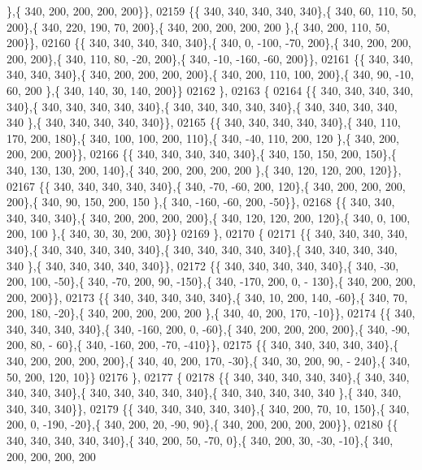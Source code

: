 \begin{DoxyCode}
      \},\{ 340, 200, 200, 200, 200\}\},
02159 \{\{ 340, 340, 340, 340, 340\},\{ 340,  60, 110,  50, 200\},\{ 340, 220, 190,  70, 200\},\{ 340, 200, 200, 200, 200
      \},\{ 340, 200, 110,  50, 200\}\},
02160 \{\{ 340, 340, 340, 340, 340\},\{ 340,   0, -100, -70, 200\},\{ 340, 200, 200, 200, 200\},\{ 340, 110,  80, -20, 
      200\},\{ 340, -10, -160, -60, 200\}\},
02161 \{\{ 340, 340, 340, 340, 340\},\{ 340, 200, 200, 200, 200\},\{ 340, 200, 110, 100, 200\},\{ 340,  90, -10,  60, 200
      \},\{ 340, 140,  30, 140, 200\}\}
02162 \},
02163 \{
02164 \{\{ 340, 340, 340, 340, 340\},\{ 340, 340, 340, 340, 340\},\{ 340, 340, 340, 340, 340\},\{ 340, 340, 340, 340, 340
      \},\{ 340, 340, 340, 340, 340\}\},
02165 \{\{ 340, 340, 340, 340, 340\},\{ 340, 110, 170, 200, 180\},\{ 340, 100, 100, 200, 110\},\{ 340, -40, 110, 200, 120
      \},\{ 340, 200, 200, 200, 200\}\},
02166 \{\{ 340, 340, 340, 340, 340\},\{ 340, 150, 150, 200, 150\},\{ 340, 130, 130, 200, 140\},\{ 340, 200, 200, 200, 200
      \},\{ 340, 120, 120, 200, 120\}\},
02167 \{\{ 340, 340, 340, 340, 340\},\{ 340, -70, -60, 200, 120\},\{ 340, 200, 200, 200, 200\},\{ 340,  90, 150, 200, 150
      \},\{ 340, -160, -60, 200, -50\}\},
02168 \{\{ 340, 340, 340, 340, 340\},\{ 340, 200, 200, 200, 200\},\{ 340, 120, 120, 200, 120\},\{ 340,   0, 100, 200, 100
      \},\{ 340,  30,  30, 200,  30\}\}
02169 \},
02170 \{
02171 \{\{ 340, 340, 340, 340, 340\},\{ 340, 340, 340, 340, 340\},\{ 340, 340, 340, 340, 340\},\{ 340, 340, 340, 340, 340
      \},\{ 340, 340, 340, 340, 340\}\},
02172 \{\{ 340, 340, 340, 340, 340\},\{ 340, -30, 200, 100, -50\},\{ 340, -70, 200,  90, -150\},\{ 340, -170, 200,   0, -
      130\},\{ 340, 200, 200, 200, 200\}\},
02173 \{\{ 340, 340, 340, 340, 340\},\{ 340,  10, 200, 140, -60\},\{ 340,  70, 200, 180, -20\},\{ 340, 200, 200, 200, 200
      \},\{ 340,  40, 200, 170, -10\}\},
02174 \{\{ 340, 340, 340, 340, 340\},\{ 340, -160, 200,   0, -60\},\{ 340, 200, 200, 200, 200\},\{ 340, -90, 200,  80, -
      60\},\{ 340, -160, 200, -70, -410\}\},
02175 \{\{ 340, 340, 340, 340, 340\},\{ 340, 200, 200, 200, 200\},\{ 340,  40, 200, 170, -30\},\{ 340,  30, 200,  90, -
      240\},\{ 340,  50, 200, 120,  10\}\}
02176 \},
02177 \{
02178 \{\{ 340, 340, 340, 340, 340\},\{ 340, 340, 340, 340, 340\},\{ 340, 340, 340, 340, 340\},\{ 340, 340, 340, 340, 340
      \},\{ 340, 340, 340, 340, 340\}\},
02179 \{\{ 340, 340, 340, 340, 340\},\{ 340, 200,  70,  10, 150\},\{ 340, 200,   0, -190, -20\},\{ 340, 200,  20, -90,  
      90\},\{ 340, 200, 200, 200, 200\}\},
02180 \{\{ 340, 340, 340, 340, 340\},\{ 340, 200,  50, -70,   0\},\{ 340, 200,  30, -30, -10\},\{ 340, 200, 200, 200, 200

\end{DoxyCode}
